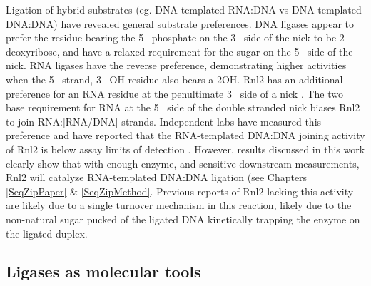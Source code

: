     Ligation of hybrid substrates (eg. DNA-templated RNA:DNA vs DNA-templated DNA:DNA) have revealed general substrate preferences. DNA ligases appear to prefer the residue bearing the 5\textprime~ phosphate on the 3\textprime~ side of the nick to be 2\textprime~ deoxyribose, and have a relaxed requirement for the sugar on the 5\textprime~ side of the nick. RNA ligases have the reverse preference, demonstrating higher activities when the 5\textprime~ strand, 3\textprime~ OH residue also bears a 2\textprime OH. Rnl2 has an additional preference for an RNA residue at the penultimate 3\textprime~ side of a nick \citep{Ho2002b,Ho2004, Nandakumar2004a, Nandakumar2006}. The two base requirement for RNA at the 5\textprime~ side of the double stranded nick biases Rnl2 to join RNA:[RNA/DNA] strands. Independent labs have measured this preference and have reported that the RNA-templated DNA:DNA joining activity of Rnl2 is below assay limits of detection \citep{Bullard2006}. However, results discussed in this work clearly show that with enough enzyme, and sensitive downstream measurements, Rnl2 will catalyze RNA-templated DNA:DNA ligation (see Chapters \ref{SeqZipPaper} \& \ref{SeqZipMethod}. Previous reports of Rnl2 lacking this activity are likely due to a single turnover mechanism in this reaction, likely due to the non-natural sugar pucked of the ligated DNA kinetically trapping the enzyme on the ligated duplex.

  \subsection{Ligases as molecular tools}

